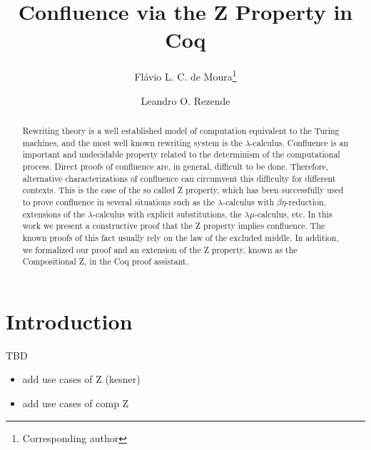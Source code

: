 \documentclass[a4paper,UKenglish,cleveref, autoref, thm-restate,authorcolumns]{lipics-v2019}
\title{Confluence via the Z Property in Coq}
\author{Flávio L. C. de Moura\footnote{Corresponding author}}{Departamento de Ci\^encia da Computacao, Universidade de Brasilia \and
  \url{http://flaviomoura.mat.br}
}{flaviomoura@unb.br}{https://orcid.org/0000-0002-9390-5751}{}
\author{Leandro O. Rezende}{Departamento de }{L-ordo.ab.chao@hotmail.com}{}{}
\begin{document}
\maketitle

\begin{abstract}
  Rewriting theory is a well established model of computation
  equivalent to the Turing machines, and the most well known rewriting
  system is the $\lambda$-calculus. Confluence is an important and
  undecidable property related to the determinism of the computational
  process. Direct proofs of confluence are, in general, difficult to
  be done. Therefore, alternative characterizations of confluence can
  circumvent this difficulty for different contexts. This is the case
  of the so called Z property, which has been successfully used to
  prove confluence in several situations such as the
  $\lambda$-calculus with $\beta\eta$-reduction, extensions of the
  $\lambda$-calculus with explicit substitutions, the
  $\lambda\mu$-calculus, etc. In this work we present a constructive
  proof that the Z property implies confluence. The known proofs of
  this fact usually rely on the law of the excluded middle. In
  addition, we formalized our proof and an extension of the Z
  property, known as the Compositional Z, in the Coq proof assistant.
\end{abstract}

\section{Introduction}

TBD

\begin{itemize}
\item add use cases of Z (kesner)
\item add use cases of comp Z \cite{Nakazawa-Fujita2016}
\end{itemize}




\end{document}
